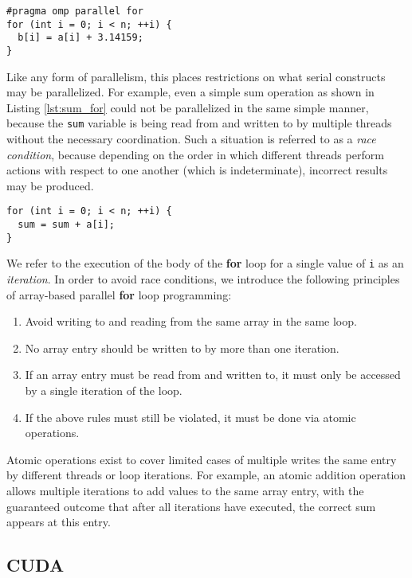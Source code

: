\begin{lstlisting}[float,style=dan-style,caption=OpenMP parallel {\bf for} loop,label=lst:omp_for]
#pragma omp parallel for
for (int i = 0; i < n; ++i) {
  b[i] = a[i] + 3.14159;
}
\end{lstlisting}

Like any form of parallelism, this places restrictions on what serial
constructs may be parallelized.
For example, even a simple sum operation as shown in Listing \ref{lst:sum_for}
could not be parallelized in the same simple manner, because the {\tt sum} variable
is being read from and written to by multiple threads without the necessary coordination.
Such a situation is referred to as a \emph{race condition}, because depending on the
order in which different threads perform actions with respect to one another (which is indeterminate),
incorrect results may be produced.

\begin{lstlisting}[float,style=dan-style,caption=Dependent {\bf for} loop,label=lst:sum_for]
for (int i = 0; i < n; ++i) {
  sum = sum + a[i];
}
\end{lstlisting}

We refer to the execution of the body of the {\bf for} loop for a single
value of {\tt i} as an \emph{iteration}.
In order to avoid race conditions, we introduce the following principles of
array-based parallel {\bf for} loop programming:

\begin{enumerate}
\item Avoid writing to and reading from the same array in the same loop.
\item No array entry should be written to by more than one iteration.
\item If an array entry must be read from and written to, it must only
be accessed by a single iteration of the loop.
\item If the above rules must still be violated, it must be done via
atomic operations.
\end{enumerate}

Atomic operations exist to cover limited cases of multiple writes the same
entry by different threads or loop iterations.
For example, an atomic addition operation allows multiple iterations to
add values to the same array entry, with the guaranteed outcome that
after all iterations have executed, the correct sum appears at this entry.

\subsection{CUDA}
\label{sec:cuda}


